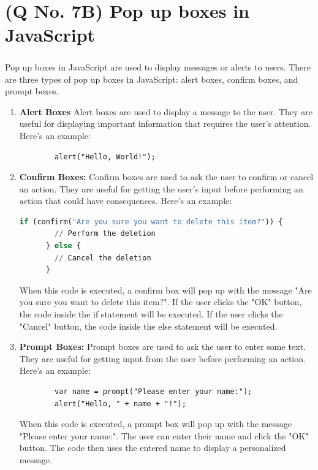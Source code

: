 \documentclass[11pt]{article}
\begin{document}
\section{(Q No. 7B) Pop up boxes in JavaScript}
\subparagraph{}
Pop up boxes in JavaScript are used to display messages or alerts to users. There are three types of pop up boxes in JavaScript: alert boxes, confirm boxes, and prompt boxes.

\begin{enumerate}
    \item \textbf{Alert Boxes} Alert boxes are used to display a message to the user. They are useful for displaying important information that requires the user's attention. Here's an example:
    \begin{lstlisting}
        alert("Hello, World!");   
    \end{lstlisting}
    \item \textbf{Confirm Boxes:}
    Confirm boxes are used to ask the user to confirm or cancel an action. They are useful for getting the user's input before performing an action that could have consequences. Here's an example:
    \begin{lstlisting}[language=python]
        if (confirm("Are you sure you want to delete this item?")) {
        // Perform the deletion
      } else {
        // Cancel the deletion
      }
    \end{lstlisting}
    When this code is executed, a confirm box will pop up with the message "Are you sure you want to delete this item?". If the user clicks the "OK" button, the code inside the if statement will be executed. If the user clicks the "Cancel" button, the code inside the else statement will be executed.
    \item \textbf{Prompt Boxes:}
    Prompt boxes are used to ask the user to enter some text. They are useful for getting input from the user before performing an action. Here's an example:
    \begin{lstlisting}
        var name = prompt("Please enter your name:");
        alert("Hello, " + name + "!");
    \end{lstlisting}
    When this code is executed, a prompt box will pop up with the message "Please enter your name:". The user can enter their name and click the "OK" button. The code then uses the entered name to display a personalized message.
\end{enumerate}
\end{document}
